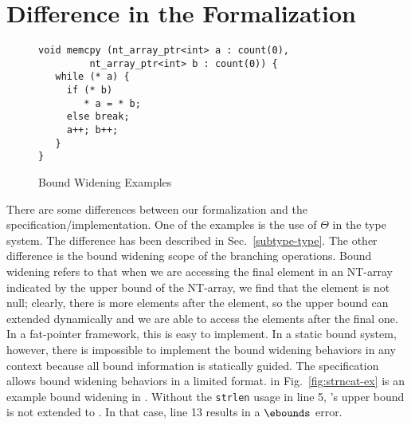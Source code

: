 \section{Difference in the \checkedc Formalization}\label{sec:discussion}

\begin{figure}[t]
{\small
{\captionsetup[lstlisting]{margin = 8 mm}

 \begin{lstlisting}[xleftmargin=8 mm]
void memcpy (nt_array_ptr<int> a : count(0),
         nt_array_ptr<int> b : count(0)) {
   while (* a) {
     if (* b)
        * a = * b;
     else break;
     a++; b++;
   }
}
  \end{lstlisting}


}
}
\caption{Bound Widening Examples}
\label{fig:bound-widening}
\end{figure}


There are some differences between our \checkedc formalization and the \checkedc specification/implementation. One of the examples is the use of $\Theta$ in the type system. The difference has been described in Sec.~\ref{subtype-type}.
The other difference is the bound widening scope of the branching operations.
Bound widening refers to that when we are accessing the final element in an NT-array indicated by the upper bound of the NT-array, we find that the element is not null; clearly, there is more elements after the element, so the upper bound can extended dynamically and we are able to access the elements after the final one.
In a fat-pointer framework, this is easy to implement. In a static bound system, however, there is impossible to implement the bound widening behaviors in any context because all bound information is statically guided. 
The \checkedc specification allows bound widening behaviors in a limited format. 
 in Fig.~\ref{fig:strncat-ex} is an example bound widening in \checkedc. Without the \texttt{strlen} usage in line 5, 's upper bound is not extended to . In that case, line 13 results in a $\ebounds$ error.

